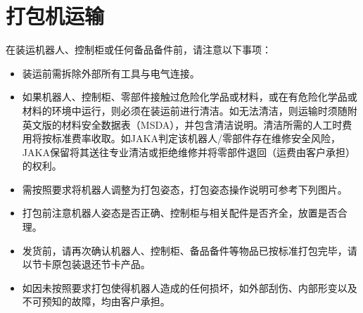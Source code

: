 \documentclass[a4paper,11pt,english,openany,oneside]{sphinxmanual}
\begin{document}
\sphinxstepscope


\chapter{打包机运输}
\label{\detokenize{_u6253_u5305_u53ca_u8fd0_u8f93:id1}}\label{\detokenize{_u6253_u5305_u53ca_u8fd0_u8f93:id2}}\label{\detokenize{_u6253_u5305_u53ca_u8fd0_u8f93::doc}}
\sphinxAtStartPar
在装运机器人、控制柜或任何备品备件前，请注意以下事项：
\begin{itemize}
\item {} 
\sphinxAtStartPar
装运前需拆除外部所有工具与电气连接。

\item {} 
\sphinxAtStartPar
如果机器人、控制柜、零部件接触过危险化学品或材料，或在有危险化学品或材料的环境中运行，则必须在装运前进行清洁。如无法清洁，则运输时须随附英文版的材料安全数据表（MSDA），并包含清洁说明。清洁所需的人工时费用将按标准费率收取。如JAKA判定该机器人/零部件存在维修安全风险，JAKA保留将其送往专业清洁或拒绝维修并将零部件退回（运费由客户承担）的权利。

\item {} 
\sphinxAtStartPar
需按照要求将机器人调整为打包姿态，打包姿态操作说明可参考下列图片。

\item {} 
\sphinxAtStartPar
打包前注意机器人姿态是否正确、控制柜与相关配件是否齐全，放置是否合理。

\item {} 
\sphinxAtStartPar
发货前，请再次确认机器人、控制柜、备品备件等物品已按标准打包完毕，请以节卡原包装退还节卡产品。

\item {} 
\sphinxAtStartPar
如因未按照要求打包使得机器人造成的任何损坏，如外部刮伤、内部形变以及不可预知的故障，均由客户承担。

\end{itemize}
\end{document}
